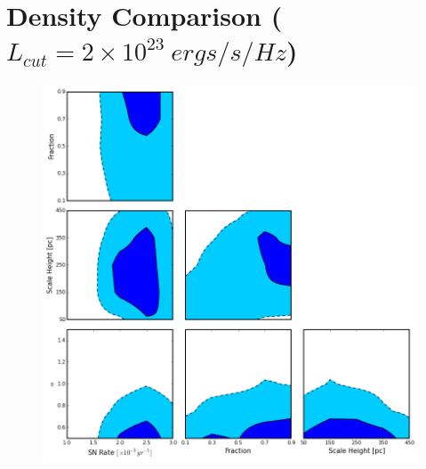 \documentclass[10pt,a4paper]{article}
\begin{document}
\section* {Density Comparison ($L_{cut} = 2 \times 10^{23}\ ergs/s/Hz$)}
\begin{figure}[h!]
\includegraphics[width=15cm]{TrianglePlot_Dens.png}
\caption{}
\end{figure}
\newpage
\end{document}
